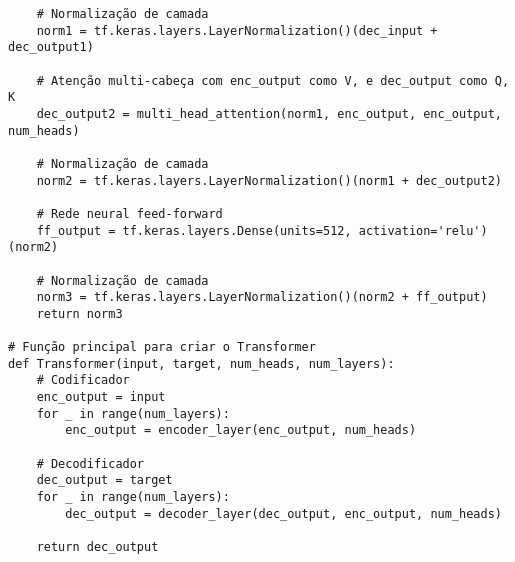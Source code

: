 \begin{lstlisting}
    # Normalização de camada
    norm1 = tf.keras.layers.LayerNormalization()(dec_input + dec_output1)

    # Atenção multi-cabeça com enc_output como V, e dec_output como Q, K
    dec_output2 = multi_head_attention(norm1, enc_output, enc_output, num_heads)

    # Normalização de camada
    norm2 = tf.keras.layers.LayerNormalization()(norm1 + dec_output2)

    # Rede neural feed-forward
    ff_output = tf.keras.layers.Dense(units=512, activation='relu')(norm2)

    # Normalização de camada
    norm3 = tf.keras.layers.LayerNormalization()(norm2 + ff_output)
    return norm3

# Função principal para criar o Transformer
def Transformer(input, target, num_heads, num_layers):
    # Codificador
    enc_output = input
    for _ in range(num_layers):
        enc_output = encoder_layer(enc_output, num_heads)

    # Decodificador
    dec_output = target
    for _ in range(num_layers):
        dec_output = decoder_layer(dec_output, enc_output, num_heads)

    return dec_output

\end{lstlisting}





